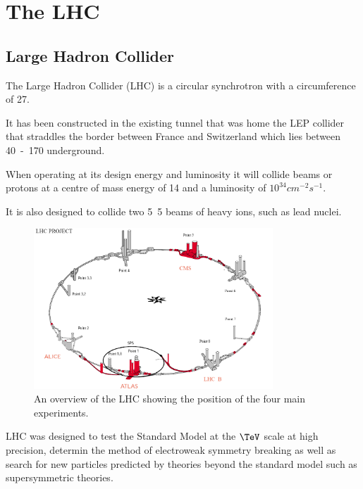 \chapter{The LHC}
\section{Large Hadron Collider}
The Large Hadron Collider (LHC) is a circular synchrotron with a circumference
of \unit{27}{\kilo\meter}.

It has been constructed in the existing tunnel that was home the LEP collider
that straddles the border between France and Switzerland which lies between
\unit{40-170}{\meter} underground.

When operating at its design energy and luminosity it will collide beams or
protons at a centre of mass energy of \unit{14}{\TeV} and a luminosity of $10^34
cm^{-2}s^{-1}$.  

It is also designed to collide two \unit{5.5}{\TeV} beams of heavy ions, such
as lead nuclei.\cite{lhc}

\begin{figure}[htb!]
  \centering
  \includegraphics[width=0.8\textwidth]{LHC}
  \caption{An overview of the LHC showing the position of the four main experiments.}
  \label{fig:LHC}
\end{figure}

LHC was designed to test the Standard Model at the $\TeV$ scale at high
precision, determin the method of electroweak symmetry breaking as well as
search for new particles predicted by theories beyond the standard model such as
supersymmetric theories.

